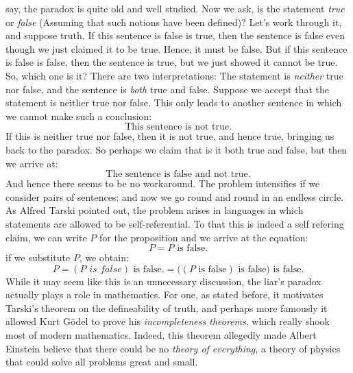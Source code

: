         say, the paradox is quite old and well studied. Now we ask, is the
        statement \textit{true} or \textit{false} (Assuming that such notions
        have been defined)? Let's work through it, and suppose truth. If
        this sentence is false is true, then the sentence is false even though
        we just claimed it to be true. Hence, it must be false. But if this
        sentence is false is false, then the sentence is true, but we just
        showed it cannot be true. So, which one is it? There are two
        interpretations: The statement is \textit{neither} true nor false, and
        the sentence is \textit{both} true and false. Suppose we accept that the
        statement is neither true nor false. This only leads to another
        sentence in which we cannot make such a conclusion:
        \begin{equation}
            \text{This sentence is not true.}
        \end{equation}
        If this is neither true nor false, then it is not true, and hence true,
        bringing us back to the paradox. So perhaps we claim that is it both
        true and false, but then we arrive at:
        \begin{equation}
            \text{The sentence is false and not true.}
        \end{equation}
        And hence there seems to be no workaround. The problem intensifies if we
        consider pairs of sentences:
        {%
            \label{eqn:That_Statement_Is_False}%
        }
        and now we go round and round in an endless circle. As Alfred Tarski
        pointed out, the problem arises in languages in which statements are
        allowed to be self-referential. To that this is indeed a self refering
        claim, we can write $P$ for the proposition and we arrive at the
        equation:
        \begin{equation}
            P=P\text{ is false.}
        \end{equation}
        if we substitute $P$, we obtain:
        \begin{equation}
            P=(P\textit{ is false})\text{ is false.}
             =\big((P\text{ is false})\text{ is false}\big)\text{ is false.}
        \end{equation}
        While it may seem like this is an unnecessary discussion, the liar's
        paradox actually plays a role in mathematics. For one, as stated before,
        it motivates Tarski's theorem on the defineability of truth, and perhaps
        more famously it allowed Kurt G\"{o}del to prove
        his \textit{incompleteness theorems}, which really shook most of modern
        mathematics. Indeed, this theorem allegedly made Albert Einstein believe
        that there could be no \textit{theory of everything}, a theory of
        physics that could solve all problems great and small.
